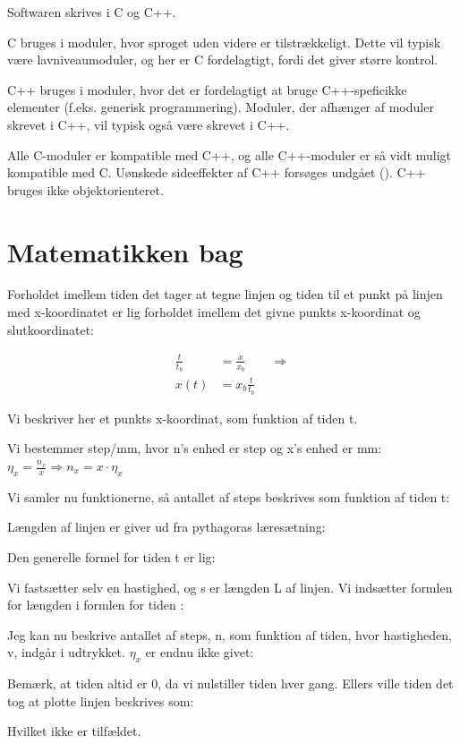 Softwaren skrives i C og C++.

C bruges i moduler, hvor sproget uden videre er tilstrækkeligt. Dette
vil typisk være lavniveaumoduler, og her er C fordelagtigt, fordi det
giver større kontrol.

C++ bruges i moduler, hvor det er fordelagtigt at bruge C++-speficikke
elementer (f.eks. generisk programmering). Moduler, der afhænger af moduler skrevet i C++, vil typisk
også være skrevet i C++.

Alle C-moduler er kompatible med C++, og alle C++-moduler er så vidt
muligt kompatible med C. Uønskede sideeffekter af C++ forsøges undgået
(). C++ bruges ikke objektorienteret.

\section{Matematikken bag}

Forholdet imellem tiden det tager at tegne linjen og tiden til et
punkt på linjen med x-koordinatet er lig forholdet imellem det givne
punkts x-koordinat og slutkoordinatet:

\begin{align*}
\frac{t}{t_b} &= \frac{x}{x_b} \qquad \Rightarrow \\
x(t) &= x_b\frac{t}{t_b}
\end{align*}

 
Vi beskriver her et punkts x-koordinat, som funktion af tiden t.

Vi bestemmer step/mm, hvor n’s enhed er step og x’s enhed er mm:
$\eta_x=\frac{n_x}{x}\Rightarrow n_x=x\cdot\eta_x$

Vi samler nu funktionerne, så antallet af steps beskrives som funktion
af tiden t:

Længden af linjen er giver ud fra pythagoras læresætning:

Den generelle formel for tiden t er lig:

Vi fastsætter selv en hastighed, og s er længden L af linjen. Vi
indsætter formlen for længden i formlen for tiden :


Jeg kan nu beskrive antallet af steps, n, som funktion af tiden, hvor
hastigheden, v, indgår i udtrykket. $\eta_x$ er endnu ikke givet:


Bemærk, at tiden altid er 0, da vi nulstiller tiden hver gang. Ellers
ville tiden det tog at plotte linjen beskrives som:
 
Hvilket ikke er tilfældet.


